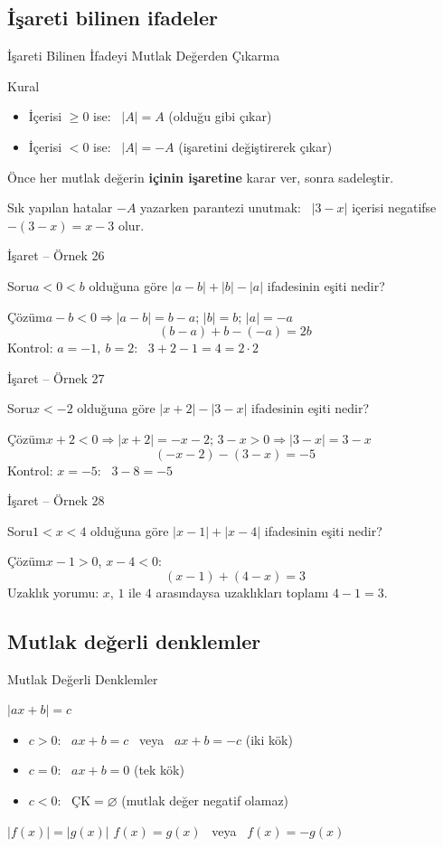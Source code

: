 \documentclass[aspectratio=169,11pt]{beamer}
\newcommand{\soru}[3]{%
\begin{frame}{#1}
  \begin{block}{Soru}\large #2\end{block}
  \pause
  \begin{exampleblock}{Çözüm}\large #3\end{exampleblock}
\end{frame}}
\begin{document}
\subsection{İşareti bilinen ifadeler}
\begin{frame}{İşareti Bilinen İfadeyi Mutlak Değerden Çıkarma}
\begin{block}{Kural}
\begin{itemize}
\item İçerisi \(\ge 0\) ise: \ \(|A|=A\) \quad (olduğu gibi çıkar)
\item İçerisi \(<0\) ise: \ \(|A|=-A\) \quad (işaretini değiştirerek çıkar)
\end{itemize}
Önce her mutlak değerin \textbf{içinin işaretine} karar ver, sonra sadeleştir.
\end{block}
\begin{alertblock}{Sık yapılan hatalar}
\(-A\) yazarken parantezi unutmak: \ \(|3-x|\) içerisi negatifse \(-(3-x)=x-3\) olur.
\end{alertblock}
\end{frame}

\soru{İşaret -- Örnek 26}
{\(a<0<b\) olduğuna göre \(|a-b|+|b|-|a|\) ifadesinin eşiti nedir?}
{\(a-b<0\Rightarrow |a-b|=b-a\); \quad \(|b|=b\); \quad \(|a|=-a\)
\[(b-a)+b-(-a)=2b\]
Kontrol: \(a=-1,\ b=2\): \ \(3+2-1=4=2\cdot 2\) \ \checkmark}

\soru{İşaret -- Örnek 27}
{\(x<-2\) olduğuna göre \(|x+2|-|3-x|\) ifadesinin eşiti nedir?}
{\(x+2<0\Rightarrow |x+2|=-x-2\); \quad \(3-x>0\Rightarrow |3-x|=3-x\)
\[(-x-2)-(3-x)=-5\]
Kontrol: \(x=-5\): \ \(3-8=-5\) \ \checkmark}

\soru{İşaret -- Örnek 28}
{\(1<x<4\) olduğuna göre \(|x-1|+|x-4|\) ifadesinin eşiti nedir?}
{\(x-1>0\), \quad \(x-4<0\):
\[(x-1)+(4-x)=3\]
Uzaklık yorumu: \(x\), \(1\) ile \(4\) arasındaysa uzaklıkları toplamı \(4-1=3\).}

\subsection{Mutlak değerli denklemler}
\begin{frame}{Mutlak Değerli Denklemler}
\begin{block}{\(|ax+b|=c\)}
\begin{itemize}
\item \(c>0\): \ \(ax+b=c\) \ veya \ \(ax+b=-c\) \quad (iki kök)
\item \(c=0\): \ \(ax+b=0\) \quad (tek kök)
\item \(c<0\): \ \(\text{ÇK}=\varnothing\) \quad (mutlak değer negatif olamaz)
\end{itemize}
\end{block}
\begin{block}{\(|f(x)|=|g(x)|\)}
\(f(x)=g(x)\) \ veya \ \(f(x)=-g(x)\)
\end{block}
\end{frame}
\end{document}
